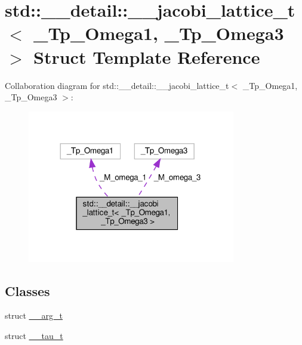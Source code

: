 \hypertarget{structstd_1_1____detail_1_1____jacobi__lattice__t}{}\section{std\+:\+:\+\_\+\+\_\+detail\+:\+:\+\_\+\+\_\+jacobi\+\_\+lattice\+\_\+t$<$ \+\_\+\+Tp\+\_\+\+Omega1, \+\_\+\+Tp\+\_\+\+Omega3 $>$ Struct Template Reference}
\label{structstd_1_1____detail_1_1____jacobi__lattice__t}


Collaboration diagram for std\+:\+:\+\_\+\+\_\+detail\+:\+:\+\_\+\+\_\+jacobi\+\_\+lattice\+\_\+t$<$ \+\_\+\+Tp\+\_\+\+Omega1, \+\_\+\+Tp\+\_\+\+Omega3 $>$\+:
\nopagebreak
\begin{figure}[H]
\begin{center}
\leavevmode
\includegraphics[width=257pt]{structstd_1_1____detail_1_1____jacobi__lattice__t__coll__graph}
\end{center}
\end{figure}
\subsection*{Classes}
\begin{DoxyCompactItemize}
\item 
struct \hyperlink{structstd_1_1____detail_1_1____jacobi__lattice__t_1_1____arg__t}{\+\_\+\+\_\+arg\+\_\+t}
\item 
struct \hyperlink{structstd_1_1____detail_1_1____jacobi__lattice__t_1_1____tau__t}{\+\_\+\+\_\+tau\+\_\+t}
\end{DoxyCompactItemize}
